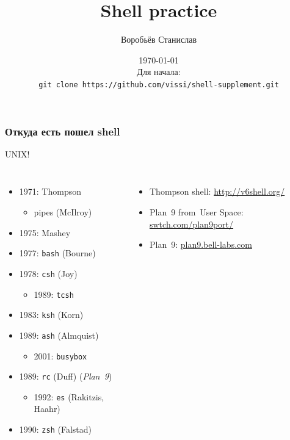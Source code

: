 \documentclass[hyperref={unicode=true}]{beamer}
\title{Shell practice}
\author{Воробьёв Станислав}
\date{\today\\[2em]
	Для начала:\\
	\texttt{git clone https://github.com/vissi/shell-supplement.git}
}
\begin{document}
\frame{\titlepage}




\frame
{
	\frametitle{Откуда есть пошел shell}
	UNIX!
    \begin{columns}[T]
	\begin{itemize}
		\item 1971: Thompson
			\begin{itemize}
				\item pipes (McIlroy)
			\end{itemize}
		\item 1975: Mashey
		\item 1977: \texttt{bash} (Bourne)
		\item 1978: \texttt{csh} (Joy)
		\begin{itemize}
			\item 1989: \texttt{tcsh}
		\end{itemize}
		\item 1983: \texttt{ksh} (Korn)
		\item 1989: \texttt{ash} (Almquist)
		\begin{itemize}
			\item 2001: \texttt{busybox}
		\end{itemize}
		\item 1989: \texttt{rc} (Duff) (\textit{Plan~9})
		\begin{itemize}
			\item 1992: \texttt{es} (Rakitzis, Haahr)
		\end{itemize}
		\item 1990: \texttt{zsh} (Falstad)
	\end{itemize}
    \begin{itemize}
		\item Thompson shell: \url{http://v6shell.org/}
		\item Plan~9 from~User Space: \url{swtch.com/plan9port/}
		\item Plan~9: \url{plan9.bell-labs.com}
    \end{itemize}
	\end{columns}
}
\end{document}
